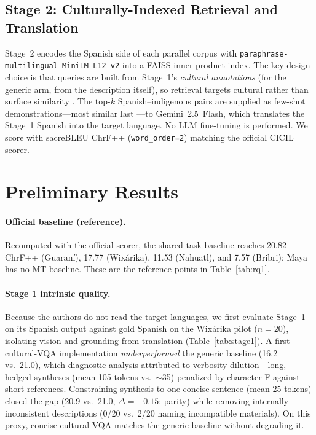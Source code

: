 \documentclass[11pt]{article}
\begin{document}
\subsection{Stage 2: Culturally-Indexed Retrieval and Translation}
Stage~2 encodes the Spanish side of each parallel corpus with
\texttt{paraphrase-multilingual-MiniLM-L12-v2}
\citep{reimers2020multilingual} into a FAISS inner-product index. The key design
choice is that queries are built from Stage~1's \emph{cultural annotations} (for
the generic arm, from the description itself), so retrieval targets cultural
rather than surface similarity \citep{agrawal2023icl,li2026ravenea}. The top-$k$
Spanish–indigenous pairs are supplied as few-shot demonstrations—most similar
last \citep{agrawal2023icl}—to Gemini~2.5~Flash, which translates the Stage~1
Spanish into the target language. No LLM fine-tuning is performed. We score with
sacreBLEU ChrF++ (\texttt{word\_order=2}) matching the official CICIL scorer.

\section{Preliminary Results}
\paragraph{Official baseline (reference).} Recomputed with the official scorer,
the shared-task baseline reaches 20.82 ChrF++ (Guaraní), 17.77 (Wixárika), 11.53
(Nahuatl), and 7.57 (Bribri); Maya has no MT baseline. These are the reference
points in Table~\ref{tab:rq1}.

\paragraph{Stage 1 intrinsic quality.} Because the authors do not read the target
languages, we first evaluate Stage~1 on its Spanish output against gold Spanish on
the Wixárika pilot ($n{=}20$), isolating vision-and-grounding from translation
(Table~\ref{tab:stage1}). A first cultural-VQA implementation
\emph{underperformed} the generic baseline (16.2 vs.\ 21.0), which diagnostic
analysis attributed to verbosity dilution—long, hedged syntheses (mean 105
tokens vs.\ $\sim$35) penalized by character-F against short references.
Constraining synthesis to one concise sentence (mean 25 tokens) closed the gap
(20.9 vs.\ 21.0, $\Delta{=}-0.15$; parity) while removing internally
inconsistent descriptions (0/20 vs.\ 2/20 naming incompatible materials). On this
proxy, concise cultural-VQA matches the generic baseline without degrading it.
\end{document}
